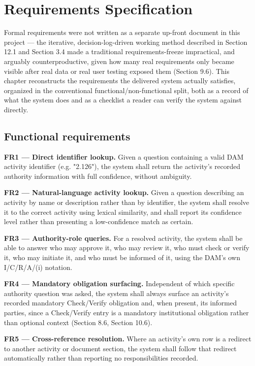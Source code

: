 \chapter{Requirements Specification}
\label{ch:requirements-specification}
Formal requirements were not written as a separate up-front document in this project — the iterative, decision-log-driven working method described in Section 12.1 and Section 3.4 made a traditional requirements-freeze impractical, and arguably counterproductive, given how many real requirements only became visible after real data or real user testing exposed them (Section 9.6). This chapter reconstructs the requirements the delivered system actually satisfies, organized in the conventional functional/non-functional split, both as a record of what the system does and as a checklist a reader can verify the system against directly.

\section{Functional requirements}
\textbf{FR1 — Direct identifier lookup.} Given a question containing a valid DAM activity identifier (e.g. "2.126"), the system shall return the activity's recorded authority information with full confidence, without ambiguity.

\textbf{FR2 — Natural-language activity lookup.} Given a question describing an activity by name or description rather than by identifier, the system shall resolve it to the correct activity using lexical similarity, and shall report its confidence level rather than presenting a low-confidence match as certain.

\textbf{FR3 — Authority-role queries.} For a resolved activity, the system shall be able to answer who may approve it, who may review it, who must check or verify it, who may initiate it, and who must be informed of it, using the DAM's own I/C/R/A/(i) notation.

\textbf{FR4 — Mandatory obligation surfacing.} Independent of which specific authority question was asked, the system shall always surface an activity's recorded mandatory Check/Verify obligation and, when present, its informed parties, since a Check/Verify entry is a mandatory institutional obligation rather than optional context (Section 8.6, Section 10.6).

\textbf{FR5 — Cross-reference resolution.} Where an activity's own row is a redirect to another activity or document section, the system shall follow that redirect automatically rather than reporting no responsibilities recorded.

